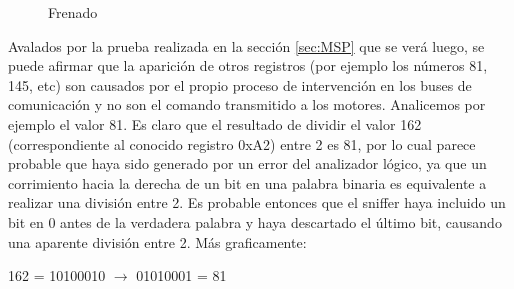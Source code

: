 \documentclass[main]{subfiles}
\begin{document}
\begin{figure} [h!]
\centering
  \caption{Frenado}
  \label{fig:frenado}
\end{figure}

Avalados por la prueba realizada en la secci\'on \ref{sec:MSP} que se ver\'a luego, se puede afirmar que la aparici\'on de otros registros (por ejemplo los n\'umeros 81, 145, etc) son causados por el propio proceso de intervención en los buses de comunicación y no son el comando transmitido a los motores. Analicemos por ejemplo el valor 81. Es claro que el resultado de dividir el valor 162 (correspondiente al conocido registro 0xA2) entre 2 es 81, por lo cual parece probable que haya sido generado por un error del analizador lógico, ya que un corrimiento hacia la derecha de un bit en una palabra binaria es equivalente a realizar una divisi\'on entre 2. Es probable entonces que el sniffer haya incluido un bit en 0 antes de la verdadera palabra y haya descartado el \'ultimo bit, causando una aparente divisi\'on entre 2. M\'as graficamente:\\

\begin{center} 162 = 10100010 $\rightarrow$ \color{green}0\color{black}1010001\color{red}\color{black} = 81\\
\end{center}
\end{document}
